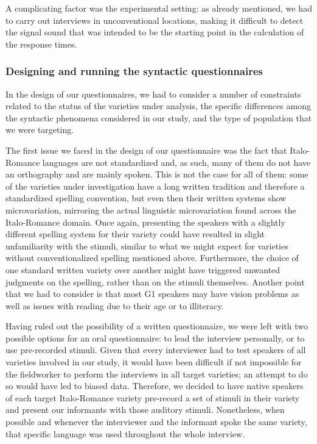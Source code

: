 \documentclass[output=paper,hidelinks]{langscibook}
\begin{document}
A complicating factor was the experimental setting: as already mentioned, we had to carry out interviews in unconventional locations, making it difficult to detect the signal sound that was intended to be the starting point in the calculation of the response times.

\subsubsection{Designing and running the syntactic questionnaires}

In the design of our questionnaires, we had to consider a number of constraints related to the status of the varieties under analysis, the specific differences among the syntactic phenomena considered in our study, and the type of population that we were targeting.

The first issue we faced in the design of our questionnaire was the fact that Italo-Romance languages are not standardized and, as such, many of them do not have an orthography and are mainly spoken. This is not the case for all of them: some of the varieties under investigation have a long written tradition and therefore a standardized spelling convention, but even then their written systems show microvariation, mirroring the actual linguistic microvariation found across the Italo-Romance domain. Once again, presenting the speakers with a slightly different spelling system for their variety could have resulted in slight unfamiliarity with the stimuli, similar to what we might expect for varieties without conventionalized spelling mentioned above. Furthermore, the choice of one standard written variety over another might have triggered unwanted judgments on the spelling, rather than on the stimuli themselves. Another point that we had to consider is that most G1 speakers may have vision problems as well as issues with reading due to their age or to illiteracy.

Having ruled out the possibility of a written questionnaire, we were left with two possible options for an oral questionnaire: to lead the interview personally, or to use pre-recorded stimuli. Given that every interviewer had to test speakers of all varieties involved in our study, it would have been difficult if not impossible for the fieldworker to perform the interviews in all target varieties; an attempt to do so would have led to biased data. Therefore, we decided to have native speakers of each target Italo-Romance variety pre-record a set of stimuli in their variety and present our informants with those auditory stimuli. Nonetheless, when possible and whenever the interviewer and the informant spoke the same variety, that specific language was used throughout the whole interview. 
\end{document}
